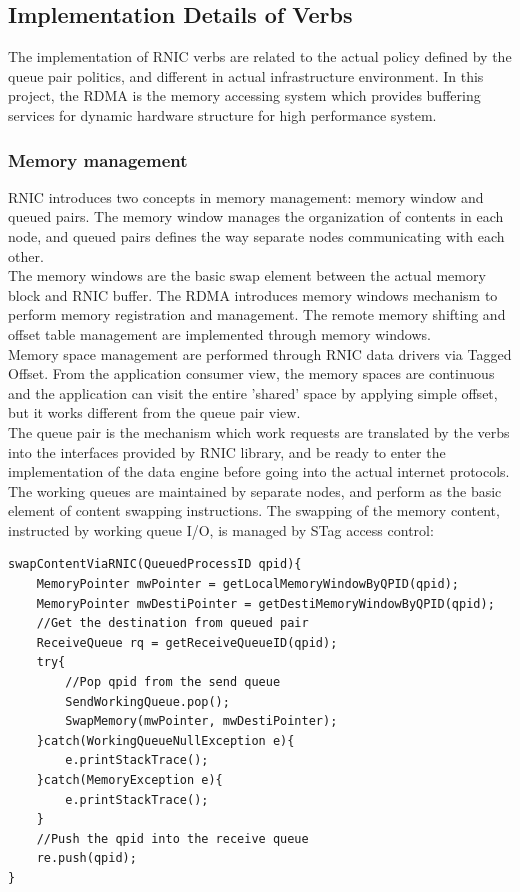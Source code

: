 \documentclass[11pt,openright,a4paper]{report}
\begin{document}
\subsection{Implementation Details of Verbs}
The implementation of RNIC verbs are related to the actual policy defined by the queue pair politics, and different in actual infrastructure environment. In this project, the RDMA is the memory accessing system which provides buffering services for dynamic hardware structure for high performance system. \\
\subsubsection{Memory management}
RNIC introduces two concepts in memory management: memory window and queued pairs. The memory window manages the organization of contents in each node, and queued pairs defines the way separate nodes communicating with each other\cite{krause2008method}.\\
The memory windows are the basic swap element between the actual memory block and RNIC buffer\cite{garcia2006binding}. The RDMA introduces memory windows mechanism to perform memory registration and management. The remote memory shifting and offset table management are implemented through memory windows. \\
Memory space management are performed through RNIC data drivers via Tagged Offset\cite{boyd2007memory}. From the application consumer view, the memory spaces are continuous and the application can visit the entire 'shared' space by applying simple offset, but it works different from the queue pair view.\\
The queue pair is the mechanism which work requests are translated by the verbs into the interfaces provided by RNIC library, and be ready to enter the implementation of the data engine before going into the actual internet protocols. The working queues are maintained by separate nodes, and perform as the basic element of content swapping instructions. The swapping of the memory content, instructed by working queue I/O, is managed by STag access control\cite{hausauer2006rdma}:
\begin{lstlisting}[breaklines,breakatwhitespace,caption={STag access control},label=stag-psudoCode]
swapContentViaRNIC(QueuedProcessID qpid){
	MemoryPointer mwPointer = getLocalMemoryWindowByQPID(qpid);
	MemoryPointer mwDestiPointer = getDestiMemoryWindowByQPID(qpid);
	//Get the destination from queued pair
	ReceiveQueue rq = getReceiveQueueID(qpid);	 
	try{
		//Pop qpid from the send queue
		SendWorkingQueue.pop();				
		SwapMemory(mwPointer, mwDestiPointer);
	}catch(WorkingQueueNullException e){
		e.printStackTrace();
	}catch(MemoryException e){
		e.printStackTrace();
	}
	//Push the qpid into the receive queue
	re.push(qpid);								
}
\end{lstlisting}
\end{document}
